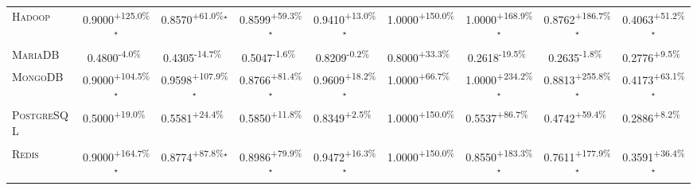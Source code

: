 \begin{table}[htbp]
\begin{tabular}{l|cccc|cccc}
\textsc{Hadoop} & \cellcolor{green!30}0.9000\textsuperscript{+125.0\%}$^\star$ & \cellcolor{green!30}0.8570\textsuperscript{+61.0\%}$^\star$ & \cellcolor{green!30}0.8599\textsuperscript{+59.3\%}$^\star$ & \cellcolor{green!30}0.9410\textsuperscript{+13.0\%}$^\star$ & \cellcolor{green!30}1.0000\textsuperscript{+150.0\%}$^{\,\,\,}$ & \cellcolor{green!30}1.0000\textsuperscript{+168.9\%}$^\star$ & \cellcolor{green!30}0.8762\textsuperscript{+186.7\%}$^\star$ & \cellcolor{green!30}0.4063\textsuperscript{+51.2\%}$^\star$ \\
\textsc{MariaDB} & \cellcolor{red!30}0.4800\textsuperscript{-4.0\%}$^{\,\,\,}$ & \cellcolor{red!30}0.4305\textsuperscript{-14.7\%}$^{\,\,\,}$ & \cellcolor{red!30}0.5047\textsuperscript{-1.6\%}$^{\,\,\,}$ & \cellcolor{red!30}0.8209\textsuperscript{-0.2\%}$^{\,\,\,}$ & \cellcolor{green!30}0.8000\textsuperscript{+33.3\%}$^{\,\,\,}$ & \cellcolor{red!30}0.2618\textsuperscript{-19.5\%}$^{\,\,\,}$ & \cellcolor{red!30}0.2635\textsuperscript{-1.8\%}$^{\,\,\,}$ & \cellcolor{green!30}0.2776\textsuperscript{+9.5\%}$^{\,\,\,}$ \\
\textsc{MongoDB} & \cellcolor{green!30}0.9000\textsuperscript{+104.5\%}$^\star$ & \cellcolor{green!30}0.9598\textsuperscript{+107.9\%}$^\star$ & \cellcolor{green!30}0.8766\textsuperscript{+81.4\%}$^\star$ & \cellcolor{green!30}0.9609\textsuperscript{+18.2\%}$^\star$ & \cellcolor{green!30}1.0000\textsuperscript{+66.7\%}$^{\,\,\,}$ & \cellcolor{green!30}1.0000\textsuperscript{+234.2\%}$^\star$ & \cellcolor{green!30}0.8813\textsuperscript{+255.8\%}$^\star$ & \cellcolor{green!30}0.4173\textsuperscript{+63.1\%}$^\star$ \\
\textsc{PostgreSQL} & \cellcolor{green!30}0.5000\textsuperscript{+19.0\%}$^{\,\,\,}$ & \cellcolor{green!30}0.5581\textsuperscript{+24.4\%}$^{\,\,\,}$ & \cellcolor{green!30}0.5850\textsuperscript{+11.8\%}$^{\,\,\,}$ & \cellcolor{green!30}0.8349\textsuperscript{+2.5\%}$^{\,\,\,}$ & \cellcolor{green!30}1.0000\textsuperscript{+150.0\%}$^{\,\,\,}$ & \cellcolor{green!30}0.5537\textsuperscript{+86.7\%}$^{\,\,\,}$ & \cellcolor{green!30}0.4742\textsuperscript{+59.4\%}$^{\,\,\,}$ & \cellcolor{green!30}0.2886\textsuperscript{+8.2\%}$^{\,\,\,}$ \\
\textsc{Redis} & \cellcolor{green!30}0.9000\textsuperscript{+164.7\%}$^\star$ & \cellcolor{green!30}0.8774\textsuperscript{+87.8\%}$^\star$ & \cellcolor{green!30}0.8986\textsuperscript{+79.9\%}$^\star$ & \cellcolor{green!30}0.9472\textsuperscript{+16.3\%}$^\star$ & \cellcolor{green!30}1.0000\textsuperscript{+150.0\%}$^{\,\,\,}$ & \cellcolor{green!30}0.8550\textsuperscript{+183.3\%}$^\star$ & \cellcolor{green!30}0.7611\textsuperscript{+177.9\%}$^\star$ & \cellcolor{green!30}0.3591\textsuperscript{+36.4\%}$^\star$ \\

\end{tabular}
\end{table}
